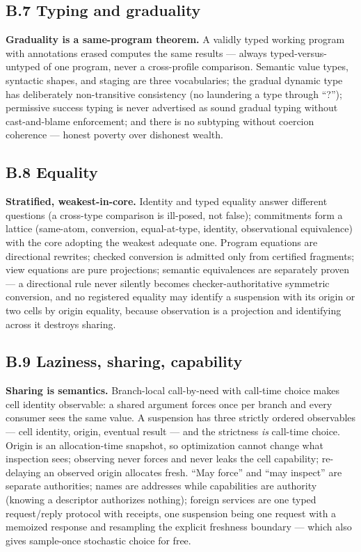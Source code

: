 \documentclass[11pt]{article}
\begin{document}
\subsection*{B.7 Typing and graduality}
\textbf{Graduality is a same-program theorem.}  A validly typed working
program with annotations erased computes the same results --- always
typed-versus-untyped of one program, never a cross-profile comparison.
Semantic value types, syntactic shapes, and staging are three
vocabularies; the gradual dynamic type has deliberately non-transitive
consistency (no laundering a type through ``?''); permissive success
typing is never advertised as sound gradual typing without cast-and-blame
enforcement; and there is no subtyping without coercion coherence ---
honest poverty over dishonest wealth.

\subsection*{B.8 Equality}
\textbf{Stratified, weakest-in-core.}  Identity and typed equality answer
different questions (a cross-type comparison is ill-posed, not false);
commitments form a lattice (same-atom, conversion, equal-at-type,
identity, observational equivalence) with the core adopting the weakest
adequate one.  Program equations are directional rewrites; checked
conversion is admitted only from certified fragments; view equations are
pure projections; semantic equivalences are separately proven --- a
directional rule never silently becomes checker-authoritative symmetric
conversion, and no registered equality may identify a suspension with its
origin or two cells by origin equality, because observation is a
projection and identifying across it destroys sharing.

\subsection*{B.9 Laziness, sharing, capability}
\textbf{Sharing is semantics.}  Branch-local call-by-need with call-time
choice makes cell identity observable: a shared argument forces once per
branch and every consumer sees the same value.  A suspension has three
strictly ordered observables --- cell identity, origin, eventual result
--- and the strictness \emph{is} call-time choice.  Origin is an
allocation-time snapshot, so optimization cannot change what inspection
sees; observing never forces and never leaks the cell capability;
re-delaying an observed origin allocates fresh.  ``May force'' and ``may
inspect'' are separate authorities; names are addresses while
capabilities are authority (knowing a descriptor authorizes nothing);
foreign services are one typed request/reply protocol with receipts, one
suspension being one request with a memoized response and resampling the
explicit freshness boundary --- which also gives sample-once stochastic
choice for free.
\end{document}
